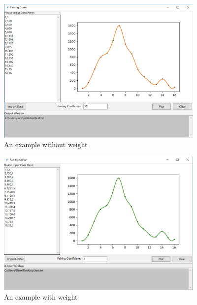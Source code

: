 \documentclass[a4paper]{ctexart}
\begin{document}
\begin{figure}[!htbp]
	\centering
	\includegraphics[width=4in]{example}
	\caption{An example without weight}
	\label{fige}
\end{figure}
\begin{figure}[!htbp]
	\centering
	\includegraphics[width=4in]{weighted}
	\caption{An example with weight}
	\label{weighted}
\end{figure}
\end{document}
